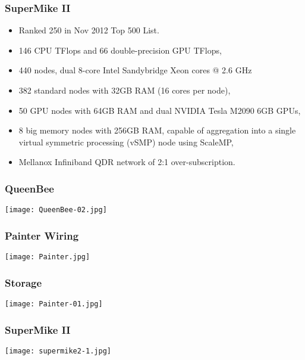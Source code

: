 \documentclass[slidestop,mathserif,compress,xcolor=svgnames,table]{beamer}
\newenvironment{eblock}[0]
{
\begin{beamerboxesrounded}[upper=uppercol2,lower=lowercol2,shadow=true]}
{\end{beamerboxesrounded}}
\begin{document}
\begin{frame}[c]
  \frametitle{\small SuperMike II}
  \begin{eblock}{}
    \begin{itemize}
      \item Ranked 250 in Nov 2012 Top 500 List.
      \item 146 CPU TFlops and 66 double-precision GPU TFlops,
      \item 440 nodes, dual 8-core  Intel Sandybridge Xeon cores @ 2.6 GHz
      \item 382 standard nodes with 32GB RAM (16 cores per node),
      \item 50 GPU nodes with 64GB RAM and dual NVIDIA Tesla M2090 6GB GPUs,
      \item 8 big memory nodes with 256GB RAM, capable of aggregation into a single virtual symmetric processing (vSMP) node using ScaleMP,
      \item Mellanox Infiniband QDR network of 2:1 over-subscription.
    \end{itemize}
  \end{eblock}
\end{frame}

\begin{frame}
  \frametitle{\small QueenBee}
  \texttt{[image: QueenBee-02.jpg]}
\end{frame}
\begin{frame}
  \frametitle{\small Painter Wiring}
  \texttt{[image: Painter.jpg]}
\end{frame}
\begin{frame}
  \frametitle{\small Storage}
  \texttt{[image: Painter-01.jpg]}
\end{frame}
\begin{frame}
  \frametitle{\small SuperMike II}
  \texttt{[image: supermike2-1.jpg]}
\end{frame}
\end{document}

